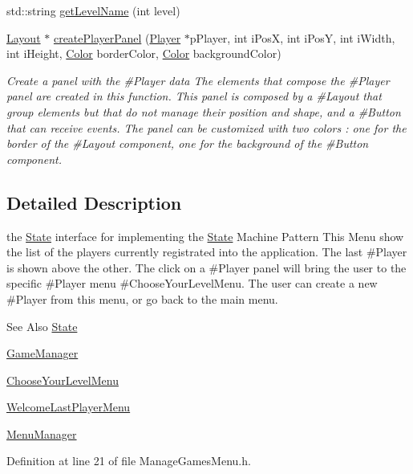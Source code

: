 \begin{DoxyCompactItemize}
std\-::string \hyperlink{class_symp_1_1_manage_games_menu_a1d36113bc83871b8cb028d1691ac3d58}{get\-Level\-Name} (int level)
\item 
\hyperlink{class_symp_1_1_layout}{Layout} $\ast$ \hyperlink{class_symp_1_1_manage_games_menu_ae468d3d6d1972468065e100003ecfec9}{create\-Player\-Panel} (\hyperlink{class_symp_1_1_player}{Player} $\ast$p\-Player, int i\-Pos\-X, int i\-Pos\-Y, int i\-Width, int i\-Height, \hyperlink{struct_symp_1_1_color}{Color} border\-Color, \hyperlink{struct_symp_1_1_color}{Color} background\-Color)
\begin{DoxyCompactList}\small\item\em Create a panel with the \#\-Player data The elements that compose the \#\-Player panel are created in this function. This panel is composed by a \#\-Layout that group elements but that do not manage their position and shape, and a \#\-Button that can receive events. The panel can be customized with two colors \-: one for the border of the \#\-Layout component, one for the background of the \#\-Button component. \end{DoxyCompactList}\end{DoxyCompactItemize}


\subsection{Detailed Description}
the \hyperlink{class_symp_1_1_state_ad44d90b6e1b68eb021ceaa0cb98141a4}{State} interface for implementing the \hyperlink{class_symp_1_1_state}{State} Machine Pattern This Menu show the list of the players currently registrated into the application. The last \#\-Player is shown above the other. The click on a \#\-Player panel will bring the user to the specific \#\-Player menu \#\-Choose\-Your\-Level\-Menu. The user can create a new \#\-Player from this menu, or go back to the main menu. \begin{DoxySeeAlso}{See Also}
\hyperlink{class_symp_1_1_state}{State} 

\hyperlink{class_symp_1_1_game_manager}{Game\-Manager} 

\hyperlink{class_symp_1_1_choose_your_level_menu}{Choose\-Your\-Level\-Menu} 

\hyperlink{class_symp_1_1_welcome_last_player_menu}{Welcome\-Last\-Player\-Menu} 

\hyperlink{class_symp_1_1_menu_manager}{Menu\-Manager} 
\end{DoxySeeAlso}


Definition at line 21 of file Manage\-Games\-Menu.\-h.



